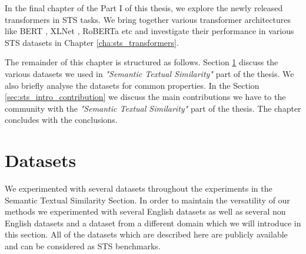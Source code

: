 In the final chapter of the Part I of this thesis, we explore the newly released transformers in STS tasks. We bring together various transformer architectures like BERT \cite{devlin-etal-2019-bert}, XLNet \cite{yang2019xlnet}, RoBERTa \cite{liu2019roberta} etc and investigate their performance in various STS datasets in Chapter \ref{cha:sts_transformers}. 

The remainder of this chapter is structured as follows. Section \ref{sec:sts_intro_datsets} discuss the various datasets we used in \textit{"Semantic Textual Similarity"} part of the thesis. We also briefly analyse the datasets for common properties. In the Section \ref{sec:sts_intro_contribution} we discuss the main contributions we have to the community with the \textit{"Semantic Textual Similarity"} part of the thesis. The chapter concludes with the conclusions.


\section{Datasets}
\label{sec:sts_intro_datsets}
We experimented with several datasets throughout the experiments in the Semantic Textual Similarity Section. In order to maintain the versatility of our methods we experimented with several English datasets as well as several non English datasets and a dataset from a different domain which we will introduce in this section. All of the datasets which are described here are publicly available and can be considered as STS benchmarks. 

